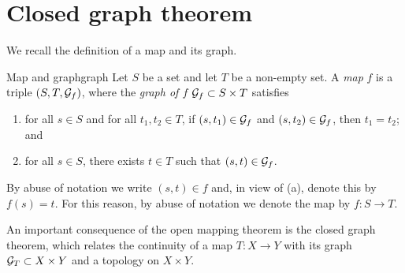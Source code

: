 \section{Closed graph theorem}
We recall the definition of a map and its graph.
\begin{definition}{Map and graph}{graph}
    Let \(S\) be a set and let \(T\) be a non-empty set. A \emph{map} \(f\) is a triple \((S, T, \mathcal{G}_{f})\), where the \emph{graph of \(f\)} \(\mathcal{G}_{f} \subset S \times T\) satisfies
    \begin{enumerate}[label=(\alph*)]
        \item for all \(s \in S\) and for all \(t_1, t_2 \in T\), if \((s, t_1) \in \mathcal{G}_{f}\) and \((s, t_2) \in \mathcal{G}_{f}\), then \(t_1 = t_2\); and
        \item for all \(s \in S\), there exists \(t \in T\) such that \((s, t) \in \mathcal{G}_{f}\).
    \end{enumerate}
    By abuse of notation we write \((s, t) \in f\) and, in view of (a), denote this by \(f(s) = t\). For this reason, by abuse of notation we denote the map by \(f : S \to T\).
\end{definition}

An important consequence of the open mapping theorem is the closed graph theorem, which relates the continuity of a map \(T : X \to Y\) with its graph \(\mathcal{G}_{T}\subset X \times Y\) and a topology on \(X \times Y\).

